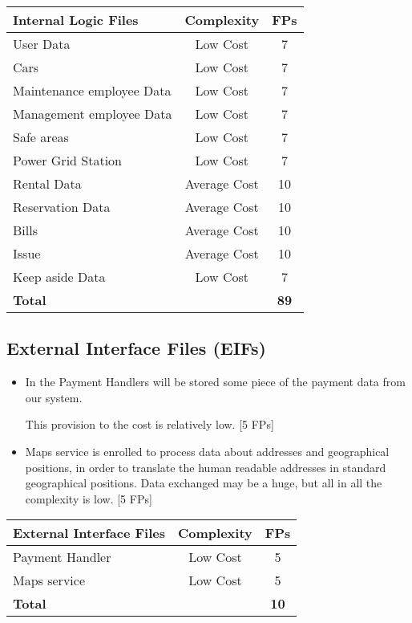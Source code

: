 \documentclass{scrreprt}
\begin{document}
\begin{center}
\begin{tabular}{lcc}
\toprule \textbf{Internal Logic Files}&\textbf{Complexity}&\textbf{FPs}\\ \midrule
User Data & Low Cost & 7\\
Cars & Low Cost & 7\\
Maintenance employee Data & Low Cost & 7\\
Management employee Data & Low Cost & 7\\
Safe areas & Low Cost & 7\\
Power Grid Station & Low Cost & 7\\
Rental Data & Average Cost & 10\\
Reservation Data & Average Cost & 10\\
Bills & Average Cost & 10\\ 
Issue & Average Cost & 10\\ 
Keep aside Data & Low Cost & 7\\ \midrule
\textbf{Total}&&\textbf{89}\\ \bottomrule
\end{tabular}
\end{center}

\subsection{External Interface Files (EIFs)}

\begin{itemize}
\item In the Payment Handlers will be stored some piece of the payment data from our system.

This provision to the cost is relatively low. [5 FPs]

\item Maps service is enrolled to process data about addresses and geographical positions, in order to translate the human readable addresses in standard geographical positions.
Data exchanged may be a huge, but all in all the complexity is low. [5 FPs]

\end{itemize}

\begin{center}
\begin{tabular}{lcc}
\toprule \textbf{External Interface Files}&\textbf{Complexity}&\textbf{FPs}\\ \midrule
Payment Handler & Low Cost & 5\\
Maps service & Low Cost & 5\\ \midrule

\textbf{Total}&&\textbf{10}\\
\bottomrule
\end{tabular}
\end{center}
\end{document}
